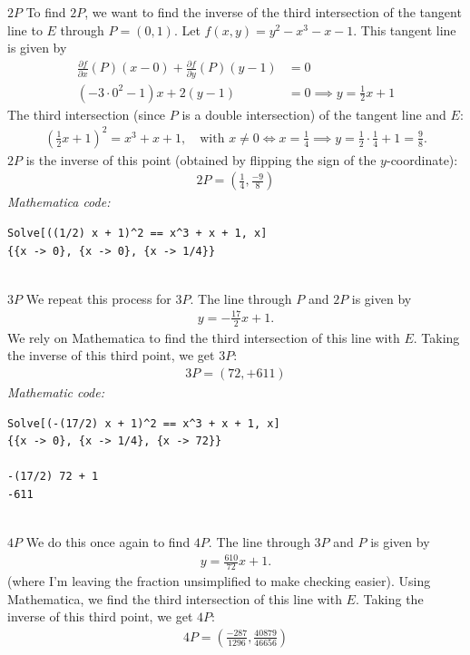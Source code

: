 \documentclass[12pt]{article}
\newcommand{\p}{\partial}
\newcommand{\nn}{\nonumber}
\newcommand{\f}[2]{\frac{#1}{#2}}
\newcommand{\lp}{\left(}
\newcommand{\rp}{\right)}
\begin{document}
\noindent $\boxed{2P}$ To find $2P$, we want to find the inverse of the third intersection of the tangent line to $E$ through $P=(0,1)$. Let $f(x,y) = y^2 - x^3 - x - 1$. This tangent line is given by
\begin{align*}
\f{\p f}{\p x}(P)(x-0) + \f{\p f}{\p y}(P)(y-1) &= 0\nn\\
(-3\cdot 0^2-1)x + 2(y-1) &= 0 \implies {y = \f{1}{2}x + 1}
\end{align*}
The third intersection (since $P$ is a double intersection) of the tangent line and $E$:
\begin{align*}
\lp \f{1}{2}x + 1 \rp^2 = x^3 + x + 1, \quad \text{with }x\neq 0 \iff  x = \f{1}{4} \implies y = \f{1}{2}\cdot\f{1}{4} + 1 = \f{9}{8}.
\end{align*}
$2P$ is the inverse of this point (obtained by flipping the sign of the $y$-coordinate):
\begin{align*}
\boxed{2P = \lp \f{1}{4}, \f{-9}{8} \rp}
\end{align*}
\textit{Mathematica code:}
\begin{lstlisting}
Solve[((1/2) x + 1)^2 == x^3 + x + 1, x]
{{x -> 0}, {x -> 0}, {x -> 1/4}}
\end{lstlisting}
$\,$\\
\noindent $\boxed{3P}$ We repeat this process for $3P$. The line through $P$ and $2P$ is given by
\begin{align*}
y = -\f{17}{2}x + 1.
\end{align*}
We rely on Mathematica to find the third intersection of this line with $E$. Taking the inverse of this third point, we get $3P$:
\begin{align*}
\boxed{3P =  \lp 72, +611 \rp}
\end{align*}
\noindent \textit{Mathematic code:}
\begin{lstlisting}
Solve[(-(17/2) x + 1)^2 == x^3 + x + 1, x]
{{x -> 0}, {x -> 1/4}, {x -> 72}}

-(17/2) 72 + 1
-611
\end{lstlisting}
$\,$\\
\noindent $\boxed{4P}$ We do this once again to find $4P$. The line through $3P$ and $P$ is given by
\begin{align*}
y =  \f{610}{72}x + 1.
\end{align*}
(where I'm leaving the fraction unsimplified to make checking easier). Using Mathematica, we find the third intersection of this line with $E$. Taking the inverse of this third point, we get $4P$:
\begin{align}
\boxed{ 4P =\lp \f{-287}{1296}, \f{40879}{46656} \rp }
\end{align}
\end{document}
